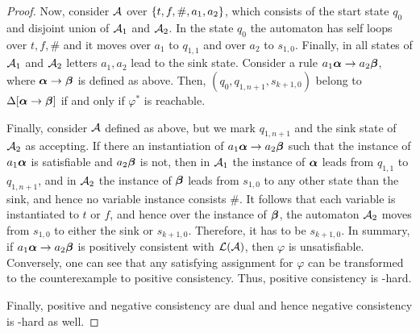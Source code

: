 \begin{proof}
Now, consider $\mathcal{A}$ over $\{t,f,\#,a_1,a_2\}$, which consists of the start state $q_0$ and disjoint union of $\mathcal{A}_1$ and $\mathcal{A}_2$.
In the state $q_0$ the automaton has self loops over $t,f,\#$ and it moves over $a_1$ to $q_{1,1}$ and over $a_2$ to $s_{1,0}$.
Finally, in all states of $\mathcal{A}_1$ and $\mathcal{A}_2$ letters $a_1,a_2$ lead to the sink state.
Consider a rule $a_1 \boldsymbol{\alpha} \to a_2 \boldsymbol{\beta}$, where  $\boldsymbol{\alpha} \to \boldsymbol{\beta}$  is defined as above. 
Then, $(q_0, q_{1, n+1},s_{k+1,0})$ belong to $\Delta[\boldsymbol{\alpha} \to \boldsymbol{\beta}]$ if and only if $\varphi^*$ is reachable.

Finally, consider $\mathcal{A}$ defined as above, but we mark $q_{1, n+1}$ and the sink state of $\mathcal{A}_2$ as accepting. 
If there an instantiation of $a_1 \boldsymbol{\alpha} \to a_2 \boldsymbol{\beta}$ such that the instance of $a_1 \boldsymbol{\alpha}$ is satisfiable and 
$a_2 \boldsymbol{\beta}$ is not, then in $\mathcal{A}_1$ the instance of $\boldsymbol{\alpha}$ leads from $q_{1,1}$ to $q_{1, n+1}$, and
in $\mathcal{A}_2$ the instance of $\boldsymbol{\beta}$ leads from $s_{1,0}$ to any other state than the sink, and 
hence no variable instance consists $\#$. It follows that each variable is instantiated to $t$ or $f$, and hence
over the instance of $\boldsymbol{\beta}$, the automaton $\mathcal{A}_2$ moves from $s_{1,0}$ to either the sink or $s_{k+1,0}$.
Therefore, it has to be $s_{k+1,0}$. 
In summary, if $a_1 \boldsymbol{\alpha} \to a_2 \boldsymbol{\beta}$ is positively consistent with $\mathcal{L}(\mathcal{A})$, then $\varphi$ is unsatisfiable.
Conversely, one can see that any satisfying assignment for  $\varphi$  can be transformed to the counterexample to positive consistency. 
Thus, positive consistency is \coNP-hard.

Finally, positive and negative consistency are dual and hence negative consistency is \coNP-hard as well.
\end{proof}


